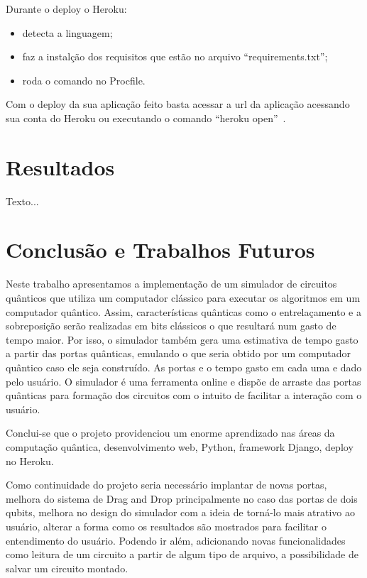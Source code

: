 \documentclass[a4paper, 12pt, oneside]{book}
\begin{document}
Durante o deploy o Heroku:
\begin{itemize}
\item detecta a linguagem;
\item faz a instalção dos requisitos que estão no arquivo ``requirements.txt'';
\item roda o comando no Procfile.
\end{itemize}

Com o deploy da sua aplicação feito basta acessar a url da aplicação acessando sua conta do Heroku ou executando o comando ``heroku open''~\cite{heroku-python}.

\chapter{Resultados}
\thispagestyle{empty} 

Texto...

\chapter{Conclusão e Trabalhos Futuros}
\thispagestyle{empty} 

Neste trabalho apresentamos a implementação de um simulador de circuitos quânticos que utiliza um computador clássico para executar os algoritmos em um computador quântico. Assim, características quânticas como o entrelaçamento e a sobreposição serão realizadas em bits clássicos o que resultará num gasto de tempo maior. Por isso, o simulador também gera uma estimativa de tempo gasto a partir das portas quânticas, emulando o que seria obtido por um computador quântico caso ele seja construído. As portas e o tempo gasto em cada uma e dado pelo usuário. O simulador é uma ferramenta online e dispõe de arraste das portas quânticas para formação dos circuitos com o intuito de facilitar a interação com o usuário.

Conclui-se que o projeto providenciou um  enorme aprendizado nas 
áreas da computação quântica, desenvolvimento web, Python, framework Django, deploy no Heroku.

Como continuidade do projeto seria necessário implantar de novas portas, melhora do sistema de Drag and Drop principalmente no caso das portas de dois qubits, melhora no design do simulador com a ideia de torná-lo mais atrativo ao usuário, alterar a forma como os resultados são mostrados para facilitar o entendimento do usuário. Podendo ir além, adicionando novas funcionalidades como leitura de um circuito a partir de algum tipo de arquivo, a possibilidade de salvar um circuito montado.



\end{document}
